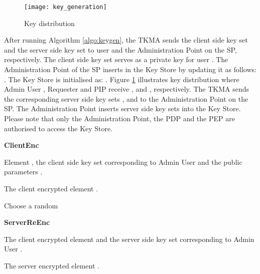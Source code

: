 \documentclass[final,5p,times,twocolumn]{elsarticle}
\newcommand{\algofontsize}{\fontsize{7}{8}\selectfont}
\begin{document}
\begin{figure}
\centering
\texttt{[image: key\_generation]} \caption{Key distribution}
\label{fig:key_generation}
\end{figure}


After running Algorithm \ref{algo:keygen}, the TKMA sends the client side key set  and the server side key set  to user  and the Administration Point on the SP, respectively. The client side key set  serves as a private key for user . The Administration Point of the SP inserts  in the Key Store by updating it as follows: . The Key Store is initialised as: . Figure \ref{fig:key_generation} illustrates key distribution where Admin User , Requester  and PIP  receive ,  and , respectively. The TKMA sends the corresponding server side key sets ,  and  to the Administration Point on the SP. The Administration Point inserts server side key sets into the Key Store. Please note that only the Administration Point, the PDP and the PEP are authorised to access the Key Store.






\begin{algorithm}[htp]
{\algofontsize
\caption{\textbf{ClientEnc}}

\label{algo:client-enc}

\begin{algorithmic}[1]

\REQUIRE Element , the client side key set  corresponding to Admin User  and the public parameters .

\ENSURE The client encrypted element .

\medskip

\STATE Choose a random  \label{line:ce-r}
\STATE  \label{line:ce-sigma}
\STATE  \label{line:ce-c1}
\STATE  \label{line:ce-c2}
\STATE  \label{line:ce-c3}
\STATE  \label{line:ce-c}

\RETURN 

\end{algorithmic}
}
\end{algorithm}




\begin{algorithm}[htp]
{\algofontsize
\caption{\textbf{ServerReEnc}}

\label{algo:server-re-enc}

\begin{algorithmic}[1]

\REQUIRE The client encrypted element  and the server side key set  corresponding to Admin User .

\ENSURE The server encrypted element .

\medskip

\STATE  \label{line:se-c1}
\STATE  \label{line:se-c2}
\STATE  \label{line:se-c}

\RETURN 

\end{algorithmic}
}
\end{algorithm}
\end{document}
